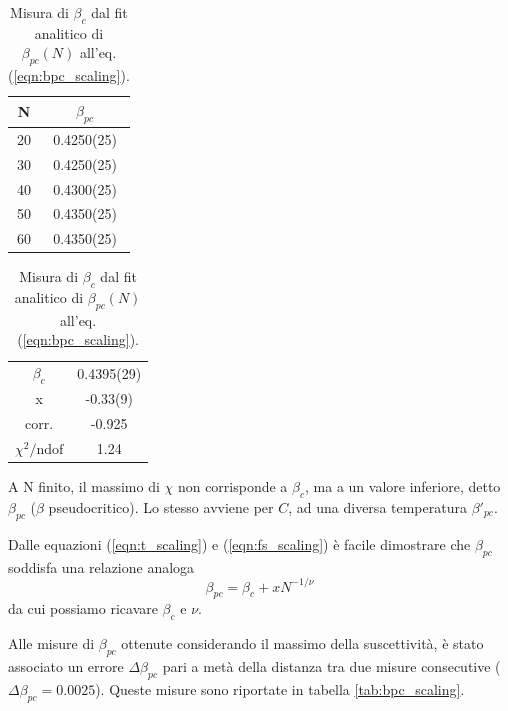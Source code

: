 \documentclass[a4paper,11pt]{article}
\newcommand{\chindof}{\chi^2 / \text{ndof}}
\begin{document}
    \begin{table}
        \centering
        \begin{tabular}{c c} \hline
            N & $\beta_{pc}$ \\ \hline
            20 &     0.4250(25)   \\ 
            30 &     0.4250(25)   \\ 
            40 &     0.4300(25)    \\ 
            50 &     0.4350(25)   \\ 
            60 &     0.4350(25)   \\ \hline
        \end{tabular}
        \caption{Misure di $\beta_{pc} (N)$.}
        \label{tab:bpc_scaling}
        \vspace{5mm}
        \centering
        \begin{tabular}{c | c } \hline
                $\beta_c$   & 0.4395(29) \\
                x           & -0.33(9) \\
                corr.       & -0.925 \\
                $\chindof$  & 1.24 \\ \hline
        \end{tabular}
        \caption{Misura di $\beta_c$ dal fit analitico di $\beta_{pc}(N)$ all'eq. (\ref{eqn:bpc_scaling}).}
        \label{tab:bpc_fit}        
    \end{table}
	
    A N finito, il massimo di $\chi$ non corrisponde a $\beta_c$, ma a un valore inferiore, detto $\beta_{pc}$ ($\beta$ pseudocritico). Lo stesso avviene per $C$, ad una diversa temperatura $\beta'_{pc}$.
    
    Dalle equazioni (\ref{eqn:t_scaling}) e (\ref{eqn:fs_scaling}) è facile dimostrare che $\beta_{pc}$ soddisfa una relazione analoga
    \begin{equation}
        \beta_{pc} = \beta_c + x N^{-1/\nu}
        \label{eqn:bpc_scaling}
    \end{equation}
    da cui possiamo ricavare $\beta_c$ e $\nu$.
    
    
    
    Alle misure di $\beta_{pc}$ ottenute considerando il massimo della suscettività, è stato associato un errore $\Delta \beta_{pc}$ pari a metà della distanza tra due misure consecutive ($\Delta \beta_{pc} = 0.0025$). Queste misure sono riportate in tabella \ref{tab:bpc_scaling}.
    
\end{document}
